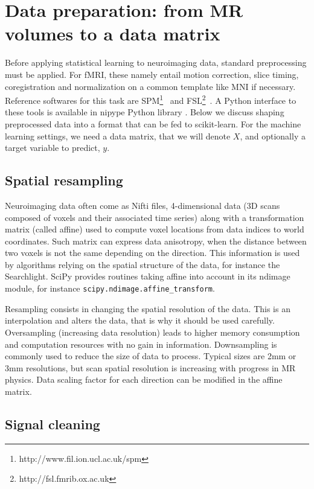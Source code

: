 \documentclass{frontiersSCNS} %
\begin{document}
\section{Data preparation: from MR volumes to a data matrix}

Before applying statistical learning to neuroimaging data, standard
preprocessing must be applied. For fMRI, these namely entail motion
correction, slice timing, coregistration and normalization on a common
template like MNI if necessary. Reference softwares for this task are
SPM\footnote{http://www.fil.ion.ucl.ac.uk/spm}~\citep{friston2007} and
FSL\footnote{http://fsl.fmrib.ox.ac.uk}~\citep{smith2004}. A Python
interface to these tools is available in nipype Python library
\citep{gorgolewski2011}. Below we discuss shaping preprocessed data into
a format that can be fed to scikit-learn. For the machine learning
settings, we need a data matrix, that we will denote $X$, and optionally a
target variable to predict, $y$.

\subsection{Spatial resampling}
\label{resampling}

Neuroimaging data often come as Nifti files, 4-dimensional data (3D scans
composed of voxels and their associated time series) along with a
transformation matrix (called affine) used to compute voxel locations
from data indices to world coordinates. Such matrix can express data
anisotropy, when the distance between two voxels is not the same
depending on the direction. This information is used by algorithms
relying on the spatial structure of the data, for instance the
Searchlight. SciPy provides routines taking affine into account in its
ndimage module, for instance \texttt{scipy.ndimage.affine\_transform}.

Resampling consists in changing the spatial resolution of the data. This is
an interpolation and alters the data, that is why it should be used carefully.
Oversampling (increasing data resolution) leads to higher memory consumption
and computation resources with no gain in information.
Downsampling is commonly used to reduce the size of data to process.
Typical sizes are 2mm or 3mm resolutions, but scan spatial resolution is
increasing with progress in MR physics.
Data scaling factor for each direction can be modified in the affine matrix.

\subsection{Signal cleaning}
\end{document}
